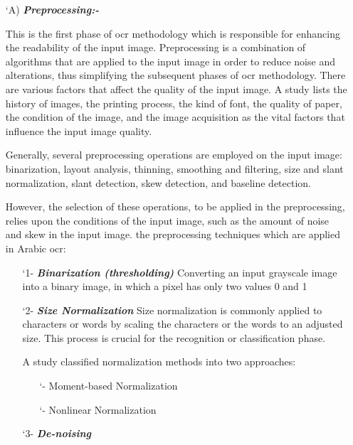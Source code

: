 \begin{itemize}[labelindent=1em,labelsep=0.25cm,leftmargin=*]
        \item[\char `A)] \textit{\textbf{Preprocessing:- }} 
        
        This is the first phase of \acrshort{ocr} methodology which is responsible for enhancing the readability of the input image.
Preprocessing is a combination of algorithms that are applied to the input image in order to reduce noise and alterations, thus simplifying the subsequent phases of \acrshort{ocr} methodology. There are various factors that affect the quality of the input image. A study lists the history of images, the printing process, the kind of font, the quality of paper, the condition of the image, and the image acquisition as the vital factors that influence the input image quality. 

Generally, several preprocessing operations are employed on the input image: binarization, layout analysis, thinning, smoothing and filtering, size and slant normalization, slant detection, skew detection, and baseline detection.

However, the selection of these operations, to be applied in the preprocessing, relies upon the conditions of the input image, such as the amount of noise and skew in the input image. 
the preprocessing techniques which are applied in Arabic \acrshort{ocr}:
\begin{itemize}[labelindent=1em,labelsep=0.25cm,leftmargin=*]
        \item[\char `1-] \textit{\textbf{Binarization (thresholding)}} 
        Converting an input grayscale image into a binary image, in which a pixel has only two values 0 and 1
        \item[\char `2-] \textit{\textbf{ Size Normalization}}  
        Size normalization is commonly applied to characters or words by scaling the characters or the words to an adjusted size.
        This process is crucial for the recognition or classification phase.
        
       A study classified normalization methods into two approaches:
       \begin{itemize}[itemsep=1pt, topsep=5pt]
        \item[\char `-]  Moment-based Normalization
        \item[\char `-]  Nonlinear Normalization 
        \end{itemize} 

        \item[\char `3-] \textit{\textbf{De-noising}} 
        

\end{itemize}
\end{itemize}

